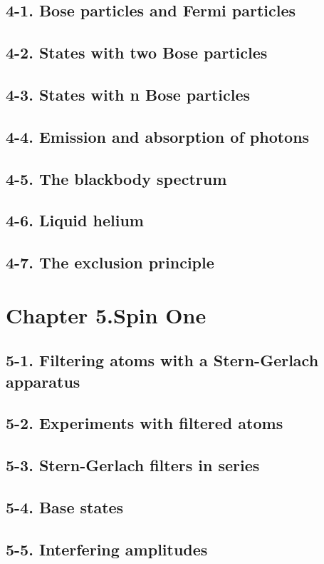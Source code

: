 \documentclass{article}
\begin{document}
\subsection{4-1. Bose particles and Fermi particles}
\subsection{4-2. States with two Bose particles}
\subsection{4-3. States with n Bose particles}
\subsection{4-4. Emission and absorption of photons}
\subsection{4-5. The blackbody spectrum}
\subsection{4-6. Liquid helium}
\subsection{4-7. The exclusion principle}
\section{Chapter 5.Spin One}
\subsection{5-1. Filtering atoms with a Stern-Gerlach apparatus}
\subsection{5-2. Experiments with filtered atoms}
\subsection{5-3. Stern-Gerlach filters in series}
\subsection{5-4. Base states}
\subsection{5-5. Interfering amplitudes}
\end{document}
